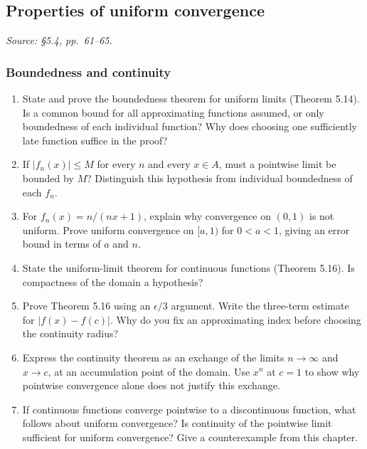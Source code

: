 \subsection{Properties of uniform convergence}
\textit{Source: \S5.4, pp.~61--65.}

\subsubsection*{Boundedness and continuity}
\begin{enumerate}[resume]
  \item State and prove the boundedness theorem for uniform limits
    (Theorem 5.14). Is a common bound for all approximating functions
    assumed, or only boundedness of each individual function?
    Why does choosing one sufficiently late function suffice in the proof?

  \item If \(|f_n(x)|\leq M\) for every \(n\) and every \(x\in A\),
    must a pointwise limit be bounded by \(M\)?
    Distinguish this hypothesis from individual boundedness of each \(f_n\).

  \item For \(f_n(x)=n/(nx+1)\), explain why convergence on \((0,1)\)
    is not uniform. Prove uniform convergence on \([a,1)\) for
    \(0<a<1\), giving an error bound in terms of \(a\) and \(n\).

  \item State the uniform-limit theorem for continuous functions
    (Theorem 5.16). Is compactness of the domain a hypothesis?

  \item Prove Theorem 5.16 using an \(\epsilon/3\) argument.
    Write the three-term estimate for \(|f(x)-f(c)|\).
    Why do you fix an approximating index before choosing the
    continuity radius?

  \item Express the continuity theorem as an exchange of the limits
    \(n\to\infty\) and \(x\to c\), at an accumulation point of
    the domain. Use \(x^n\) at \(c=1\) to show why pointwise
    convergence alone does not justify this exchange.

  \item If continuous functions converge pointwise to a discontinuous
    function, what follows about uniform convergence?
    Is continuity of the pointwise limit sufficient for uniform
    convergence? Give a counterexample from this chapter.
\end{enumerate}

